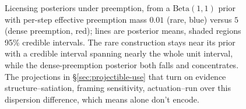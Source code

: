 \begin{figure}[t]
\caption{Licensing posteriors under preemption, from a $\mathrm{Beta}(1,1)$ prior with per-step effective preemption mass $0.01$ (rare, blue) versus $5$ (dense preemption, red); lines are posterior means, shaded regions 95\% credible intervals. The rare construction stays near its prior with a credible interval spanning nearly the whole unit interval, while the dense-preemption posterior both falls and concentrates. The projections in \S\ref{sec:projectible-use} that turn on evidence structure--satiation, framing sensitivity, actuation--run over this dispersion difference, which means alone don't encode.}
\label{fig:posterior-means}
\end{figure}
